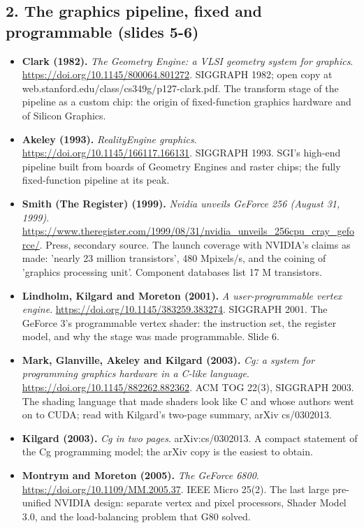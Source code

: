 \documentclass[11pt,letterpaper]{article}
\begin{document}
\subsection*{2. The graphics pipeline, fixed and programmable (slides 5-6)}
\begin{itemize}[leftmargin=1.2em,itemsep=3pt]\sloppy
\item \textbf{Clark (1982).} \textit{The Geometry Engine: a VLSI geometry system for graphics}. \url{https://doi.org/10.1145/800064.801272}. SIGGRAPH 1982; open copy at web.stanford.edu/class/cs349g/p127-clark.pdf. The transform stage of the pipeline as a custom chip: the origin of fixed-function graphics hardware and of Silicon Graphics.
\item \textbf{Akeley (1993).} \textit{RealityEngine graphics}. \url{https://doi.org/10.1145/166117.166131}. SIGGRAPH 1993. SGI's high-end pipeline built from boards of Geometry Engines and raster chips; the fully fixed-function pipeline at its peak.
\item \textbf{Smith (The Register) (1999).} \textit{Nvidia unveils GeForce 256 (August 31, 1999)}. \url{https://www.theregister.com/1999/08/31/nvidia_unveils_256cpu_cray_geforce/}. Press, secondary source. The launch coverage with NVIDIA's claims as made: 'nearly 23 million transistors', 480 Mpixels/s, and the coining of 'graphics processing unit'. Component databases list 17 M transistors.
\item \textbf{Lindholm, Kilgard and Moreton (2001).} \textit{A user-programmable vertex engine}. \url{https://doi.org/10.1145/383259.383274}. SIGGRAPH 2001. The GeForce 3's programmable vertex shader: the instruction set, the register model, and why the stage was made programmable. Slide 6.
\item \textbf{Mark, Glanville, Akeley and Kilgard (2003).} \textit{Cg: a system for programming graphics hardware in a C-like language}. \url{https://doi.org/10.1145/882262.882362}. ACM TOG 22(3), SIGGRAPH 2003. The shading language that made shaders look like C and whose authors went on to CUDA; read with Kilgard's two-page summary, arXiv cs/0302013.
\item \textbf{Kilgard (2003).} \textit{Cg in two pages}. arXiv:cs/0302013. A compact statement of the Cg programming model; the arXiv copy is the easiest to obtain.
\item \textbf{Montrym and Moreton (2005).} \textit{The GeForce 6800}. \url{https://doi.org/10.1109/MM.2005.37}. IEEE Micro 25(2). The last large pre-unified NVIDIA design: separate vertex and pixel processors, Shader Model 3.0, and the load-balancing problem that G80 solved.

\end{itemize}
\end{document}
